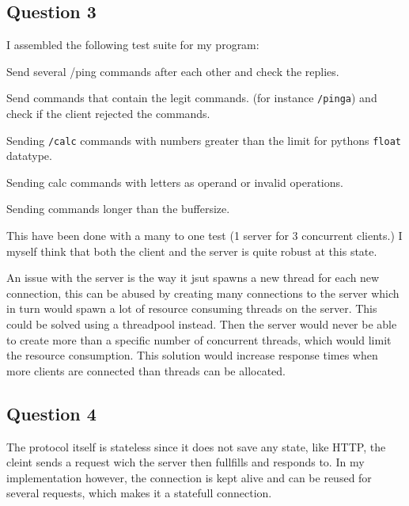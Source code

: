 \documentclass[10pt]{article}
\begin{document}
\subsection{Question 3}

I assembled the following test suite for my program:
\begin{enumerate*}
    \item Send several /ping commands after each other and check the replies.
    \item Send commands that contain the legit commands. (for instance
          \texttt{/pinga}) and check if the client rejected the commands.
    \item Sending \texttt{/calc} commands with numbers greater than the limit
          for pythons \texttt{float} datatype.
    \item Sending calc commands with letters as operand or invalid operations.
    \item Sending commands longer than the buffersize.
\end{enumerate*}

This have been done with a many to one test (1 server for 3 concurrent clients.)
I myself think that both the client and the server is quite robust at this
state.

An issue with the server is the way it jsut spawns a new thread for each new
connection, this can be abused by creating many connections to the server which
in turn would spawn a lot of resource consuming threads on the server. This
could be solved using a threadpool instead. Then the server would never be able
to create more than a specific number of concurrent threads, which would limit
the resource consumption. This solution would increase response times when more
clients are connected than threads can be allocated.

\subsection{Question 4}

The protocol itself is stateless since it does not save any state, like HTTP,
the cleint sends a request wich the server then fullfills and responds to. In my
implementation however, the connection is kept alive and can be reused for
several requests, which makes it a statefull connection.
\end{document}
